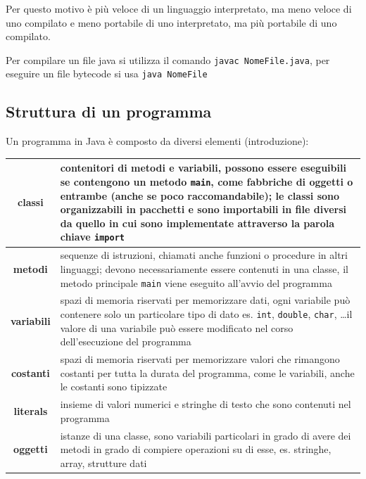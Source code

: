 \documentclass[a4paper]{article}
\begin{document}
Per questo motivo è più veloce di un linguaggio interpretato, ma meno veloce di uno compilato e meno portabile di uno
interpretato, ma più portabile di uno compilato.

Per compilare un file java si utilizza il comando \verb|javac NomeFile.java|, per eseguire un file bytecode si usa
\verb|java NomeFile|


\subsection{Struttura di un programma}
Un programma in Java è composto da diversi elementi (introduzione):
\begin{center}
	\begin{tabularx}{\textwidth}{c X}
		\textbf{classi}
		& contenitori di metodi e variabili, possono essere eseguibili se contengono un metodo \verb|main|, come fabbriche
		di oggetti o entrambe (anche se poco raccomandabile); le classi sono organizzabili in pacchetti e sono importabili
		in file diversi da quello in cui sono implementate attraverso la parola chiave \verb|import| \\
		\midrule
		
		\textbf{metodi}
		& sequenze di istruzioni, chiamati anche funzioni o procedure in altri linguaggi; devono necessariamente essere
		contenuti in una classe, il metodo principale \verb|main| viene eseguito all'avvio del programma \\
		\midrule

		\textbf{variabili}
		& spazi di memoria riservati per memorizzare dati, ogni variabile può contenere solo un particolare tipo di dato
		es. \verb|int|, \verb|double|, \verb|char|, \dots il valore di una variabile può essere modificato nel corso
		dell'esecuzione del programma \\
		\midrule
		
		\textbf{costanti}
		& spazi di memoria riservati per memorizzare valori che rimangono costanti per tutta la durata del programma,
		come le variabili, anche le costanti sono tipizzate \\
		\midrule
		
		\textbf{literals}
		& insieme di valori numerici e stringhe di testo che sono contenuti nel programma \\
		\midrule
		
		\textbf{oggetti}
		& istanze di una classe, sono variabili particolari in grado di avere dei metodi in grado di compiere operazioni
		su di esse, es. stringhe, array, strutture dati \\
		\midrule
		

\end{tabularx}
\end{center}
\end{document}
